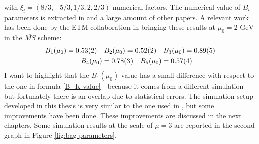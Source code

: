 \documentclass[english, LaM, oneside, noexaminfo]{sapthesis}
\newcommand{\gev}{\text{ GeV}}
\begin{document}
with $\xi_i = \left(8/3, -5/3, 1/3, 2, 2/3\right)$ numerical factors.
The numerical value of $B_i$-parameters is extracted in \cite{Bparameters} and a large amount of other papers.
A relevant work has been done by the ETM collaboration in \cite{KMBSM} bringing these results at $\mu_0 = 2\gev$ in the $\overline{MS}$ scheme:
\begin{equation}\label{eq:b_i-in-kmbsm}
    \begin{aligned}
        & B_1(\mu_0) = 0.53(2) \quad B_2(\mu_0) = 0.52(2) \quad B_3(\mu_0) = 0.89(5) \\
        & \hspace*{18mm} B_4(\mu_0) = 0.78(3) \quad B_5(\mu_0) = 0.57(4)
    \end{aligned}
\end{equation}
I want to highlight that the $B_1(\mu_0)$ value has a small difference with respect to the one in formula \ref{B_K-value} - because it comes from a different simulation - but fortunately there is an overlap due to statistical errors.
The simulation setup developed in this thesis is very similar to the one used in \cite{KMBSM}, but some improvements have been done.
These improvements are discussed in the next chapters.
Some simulation results at the scale of $\mu=3$ \gev\space are reported in the second graph in Figure \ref{fig:bag-parameters}.
\end{document}
